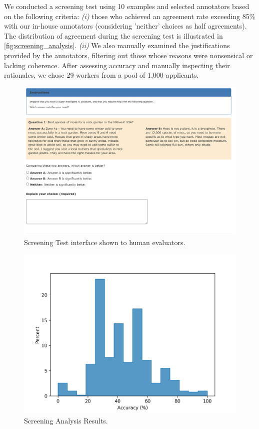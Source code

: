 We conducted a screening test using 10 examples and selected annotators based on the following criteria: \textit{(i)} those who achieved an agreement rate exceeding 85\% with our in-house annotators (considering 'neither' choices as half agreements). The distribution of agreement during the screening test is illustrated in \autoref{fig:screening_analysis}. \textit{(ii)} We also manually examined the justifications provided by the annotators, filtering out those whose reasons were nonsensical or lacking coherence. After assessing accuracy and manually inspecting their rationales, we chose 29 workers from a pool of 1,000 applicants. 

\begin{figure}
  \centering
  \includegraphics[width=1\columnwidth]{figs/screening_test.png}
  \caption{Screening Test interface shown to human evaluators.}
  \label{fig:screening_test}
\end{figure}

\begin{figure}
  \centering
  \includegraphics[width=0.6\columnwidth]{figs/screening_analysis.png}
  \caption{Screening Analysis Results.}
  \label{fig:screening_analysis}
\end{figure}


